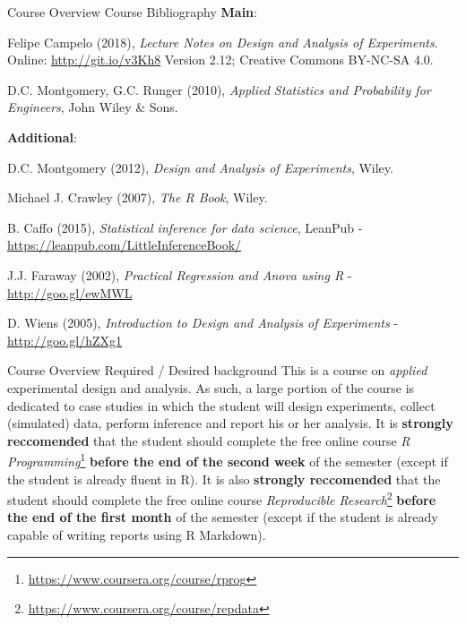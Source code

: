 \documentclass[t]{beamer}
\begin{document}
\begin{ftst}
{Course Overview}
{Course Bibliography}
\textbf{Main}:\\
{\footnotesize
\bitems Felipe Campelo (2018), \textit{Lecture Notes on Design and Analysis of Experiments}. Online: \url{http://git.io/v3Kh8} Version 2.12; Creative Commons BY-NC-SA 4.0.
\item D.C. Montgomery, G.C. Runger (2010), \textit{Applied Statistics and Probability for Engineers}, John Wiley \& Sons.
\eitem}
\vhalf
\textbf{Additional}:
{\footnotesize
\bitems D.C. Montgomery (2012), \textit{Design and Analysis of Experiments}, Wiley.
\item Michael J. Crawley (2007), \textit{The R Book}, Wiley.
\item B. Caffo (2015), \textit{Statistical inference for data science}, LeanPub - {\small\url{https://leanpub.com/LittleInferenceBook/}}
\item J.J. Faraway (2002), \textit{Practical Regression and Anova using R} - {\small\url{http://goo.gl/ewMWL}}
\item D. Wiens (2005), \textit{Introduction to Design and Analysis of Experiments} - {\small\url{http://goo.gl/hZXg1}}
\eitem}
\end{ftst}


\begin{ftst}
{Course Overview}
{Required / Desired background}
This is a course on \textit{applied} experimental design and analysis. As such, a large portion of the course is dedicated to case studies in which the student will design experiments, collect (simulated) data, perform inference and report his or her analysis.
\vone
It is \textbf{strongly reccomended} that the student should complete the free online course  \textit{R Programming}\footnote{{\scriptsize\url{https://www.coursera.org/course/rprog}}} \textbf{before the end of the second week} of the semester (except if the student is already fluent in R).
\vone
It is also \textbf{strongly reccomended} that the student should complete the free online course  \textit{Reproducible Research}\footnote{{\scriptsize\url{https://www.coursera.org/course/repdata}}} \textbf{before the end of the first month} of the semester (except if the student is already capable of writing reports using R Markdown).
\end{ftst}


%

\end{document}
